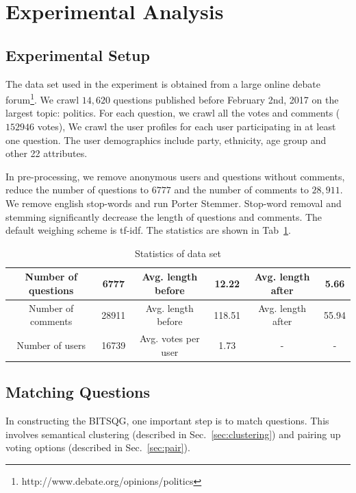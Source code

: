 \documentclass{llncs}
\begin{document}
\section{Experimental Analysis}\label{sec:experiment}

\subsection{Experimental Setup}

The data set used in the experiment is obtained from a large online debate forum\footnote{http://www.debate.org/opinions/politics}. We crawl $14,620$ questions published before February 2nd, 2017 on the largest topic: politics. For each question, we crawl all the votes and comments ($152946$ votes), We crawl the user profiles for each user participating in at least one question. The user demographics include party, ethnicity, age group and other 22 attributes.  

In pre-processing, we remove anonymous users and questions without comments, reduce the number of questions to $6777$ and the number of comments to $28,911$. We remove english stop-words and run Porter Stemmer. Stop-word removal and stemming significantly decrease the length of questions and comments. The default weighing scheme is tf-idf. The statistics are shown in Tab~\ref{tab:data}. 


\begin{table}[htp]
\caption{Statistics of data set}
\begin{center}
\begin{tabular}{|c|c|c|c|c|c|}
\hline
Number of questions  & 6777 & Avg. length  before & 12.22 & Avg. length  after & 5.66\\\hline
Number of comments & 28911 & Avg. length  before & 118.51 & Avg. length  after & 55.94\\\hline
Number of users &16739 & Avg. votes per user & 1.73 & - & -\\\hline
\end{tabular}
\end{center}
\label{tab:data}
\end{table}%



\subsection{Matching Questions}

In constructing the BITSQG, one important step is to match questions. This involves semantical clustering (described in Sec.~\ref{sec:clustering}) and pairing up voting options (described in Sec.~\ref{sec:pair}).  
\end{document}
